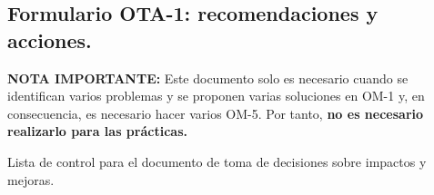 \documentclass[12pt,a4paper,twoside,spanish]{article}      %
\begin{document}
\subsection{Formulario OTA-1: recomendaciones y acciones.}



\noindent \textbf{NOTA IMPORTANTE: } Este documento solo es necesario cuando se identifican varios problemas y se proponen varias soluciones en OM-1 y, en consecuencia, es necesario hacer varios OM-5. Por tanto, \textbf{no es necesario realizarlo para las prácticas.} 


Lista de control para el documento de toma de decisiones sobre impactos y mejoras.

\vspace*{1cm}
\end{document}
